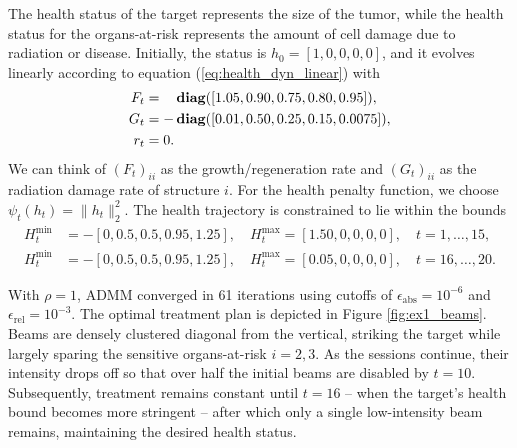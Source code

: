 \documentclass[12pt]{article}
\begin{document}
The health status of the target represents the size of the tumor, while the health status for the organs-at-risk represents the amount of cell damage due to radiation or disease. Initially, the status is $h_0 = [1,0,0,0,0]$, and it evolves linearly according to equation (\ref{eq:health_dyn_linear}) with
\begin{align*}
	F_t &= \phantom{+}\mathop{\bf diag}([1.05, 0.90, 0.75, 0.80, 0.95]), \\
	G_t &= -\mathop{\bf diag}([0.01, 0.50, 0.25, 0.15, 0.0075]), \\
	r_t &= 0.
\end{align*}
We can think of $(F_t)_{ii}$ as the growth/regeneration rate and $(G_t)_{ii}$ as the radiation damage rate of structure $i$. For the health penalty function, we choose $\psi_t(h_t) = \|h_t\|_2^2$. The health trajectory is constrained to lie within the bounds
\begin{align*}
	H_t^{\min} &= -[0, 0.5, 0.5, 0.95, 1.25], \quad H_t^{\max} = [1.50, 0, 0, 0, 0], \quad t = 1,\ldots,15, \\
	H_t^{\min} &= -[0, 0.5, 0.5, 0.95, 1.25], \quad H_t^{\max} = [0.05, 0, 0, 0, 0], \quad t = 16,\ldots,20.
\end{align*}

With $\rho = 1$, ADMM converged in 61 iterations using cutoffs of $\epsilon_{\text{abs}} = 10^{-6}$ and $\epsilon_{\text{rel}} = 10^{-3}$. The optimal treatment plan is depicted in Figure \ref{fig:ex1_beams}. Beams are densely clustered diagonal from the vertical, striking the target while largely sparing the sensitive organs-at-risk $i=2,3$. As the sessions continue, their intensity drops off so that over half the initial beams are disabled by $t=10$. Subsequently, treatment remains constant until $t=16$ -- when the target's health bound becomes more stringent -- after which only a single low-intensity beam remains, maintaining the desired health status.  %
\end{document}
